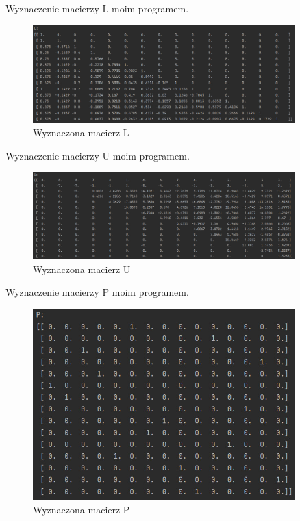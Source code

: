 \documentclass[9pt]{article}
\begin{document}
Wyznaczenie macierzy L moim programem.

\begin{figure}[h]
  \centering
  \includegraphics[width=0.9\textwidth]{L_2.jpg}
  \caption{Wyznaczona macierz L}
\end{figure}
\newpage

Wyznaczenie macierzy U moim programem.

\begin{figure}[h]
  \centering
  \includegraphics[width=0.9\textwidth]{U_2.jpg}
  \caption{Wyznaczona macierz U}
\end{figure}
\newpage

Wyznaczenie macierzy P moim programem.

\begin{figure}[h]
  \centering
  \includegraphics[width=0.9\textwidth]{P_2.jpg}
  \caption{Wyznaczona macierz P}
\end{figure}
\newpage
\end{document}
